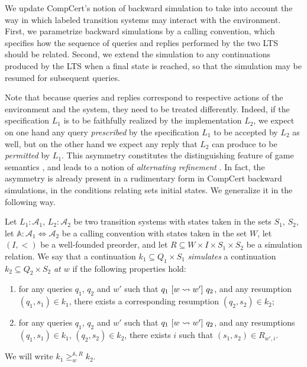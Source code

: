 We update CompCert's notion of backward simulation
to take into account the way in which labeled transition systems
may interact with the environment.
First,
we parametrize backward simulations by a calling convention,
which specifies how the sequence of queries and replies
performed by the two LTS should be related.
Second,
we extend the simulation to any continuations
produced by the LTS when a final state is reached,
so that the simulation may be resumed for subsequent queries.

Note that because queries and replies
correspond to respective actions of the environment and the system,
they need to be treated differently.
Indeed,
if the specification $L_1$ is to be faithfully realized
by the implementation $L_2$,
we expect on one hand
any query \emph{prescribed} by the specification $L_1$
to be accepted by $L_2$ as well,
but on the other hand
we expect any reply that $L_2$ can produce
to be \emph{permitted} by $L_1$.
This asymmetry constitutes the distinguishing feature
of game semantics \cite{cspgs},
and leads to a notion of \emph{alternating refinement} \cite{altref}.
In fact,
the asymmetry is already present in a rudimentary form
in CompCert backward simulations,
in the conditions relating sets initial states.
We generalize it in the following way.

\begin{definition}
Let $L_1 : \mathcal{A}_1$, $L_2 : \mathcal{A}_2$
be two transition systems with states taken in the sets $S_1$, $S_2$,
let $\mathbb{A} : \mathcal{A}_1 \Leftrightarrow \mathcal{A}_2$
be a calling convention with states taken in the set $W$,
let $(I, <)$ be a well-founded preorder, and
let $R \subseteq W \times I \times S_1 \times S_2$
be a simulation relation.
We say that
a continuation $k_1 \subseteq Q_1 \times S_1$
\emph{simulates}
a continuation $k_2 \subseteq Q_2 \times S_2$
\emph{at $w$}
if the following properties hold:
\begin{enumerate}
\item
  for any queries $q_1$, $q_2$ and $w'$ such that
  $q_1 \ [{w \leadsto w'}]\  q_2$,
  and any resumption $(q_1, s_1) \in k_1$,
  there exists a corresponding resumption $(q_2, s_2) \in k_2$;
\item
  for any queries $q_1$, $q_2$ and $w'$ such that
  $q_1 \ [{w \leadsto w'}]\  q_2$,
  and any resumptions $(q_1, s_1) \in k_1$, $(q_2, s_2) \in k_2$,
  there exists $i$ such that $(s_1, s_2) \in R_{w',i}$.
\end{enumerate}
We will write $k_1 \ge^{\mathbb{A},R}_w k_2$.
\end{definition}

